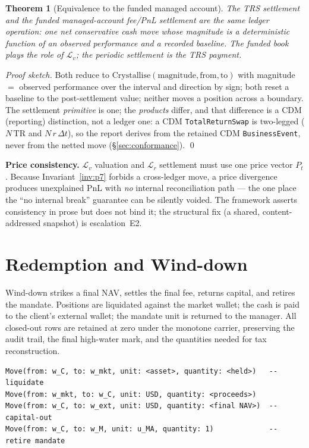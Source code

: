 \documentclass[11pt,a4paper]{article}
\newtheorem{theorem}[definition]{Theorem}
\begin{document}
\begin{theorem}[Equivalence to the funded managed account]
The TRS settlement and the funded managed-account fee/PnL settlement are the \emph{same} ledger
operation: one net conservative cash move whose magnitude is a deterministic function of an
observed performance and a recorded baseline. The funded book plays the role of $\mathcal{L}_v$;
the periodic settlement is the TRS payment.
\end{theorem}
\noindent\textit{Proof sketch.} Both reduce to $\mathrm{Crystallise}(\text{magnitude},\text{from},
\text{to})$ with magnitude $=$ observed performance over the interval and direction by sign; both
reset a baseline to the post-settlement value; neither moves a position across a boundary.
The settlement \emph{primitive} is one; the \emph{products} differ, and that difference is a CDM
(reporting) distinction, not a ledger one: a CDM \texttt{TotalReturnSwap} is two-legged
($N\,\mathrm{TR}$ and $N\,r\,\Delta t$), so the report derives from the retained CDM
\texttt{BusinessEvent}, never from the netted move (\S\ref{sec:conformance}). \qed

\noindent\textbf{Price consistency.} $\mathcal{L}_v$ valuation and $\mathcal{L}_r$ settlement must
use one price vector $P_t$. Because Invariant~\ref{inv:p7} forbids a cross-ledger move, a price
divergence produces unexplained PnL with \emph{no} internal reconciliation path --- the one place
the ``no internal break'' guarantee can be silently voided. The framework asserts consistency in
prose but does not bind it; the structural fix (a shared, content-addressed snapshot) is
escalation~E2.

\section{Redemption and Wind-down}
\label{sec:redemption}

Wind-down strikes a final NAV, settles the final fee, returns capital, and retires the mandate.
Positions are liquidated against the market wallet; the cash is paid to the client's external
wallet; the mandate unit is returned to the manager. All closed-out rows are retained at zero
under the monotone carrier, preserving the audit trail, the final high-water mark, and the
quantities needed for tax reconstruction.
\begin{lstlisting}
Move(from: w_C, to: w_mkt, unit: <asset>, quantity: <held>)   -- liquidate
Move(from: w_mkt, to: w_C, unit: USD, quantity: <proceeds>)
Move(from: w_C, to: w_ext, unit: USD, quantity: <final NAV>)  -- capital-out
Move(from: w_C, to: w_M, unit: u_MA, quantity: 1)             -- retire mandate
\end{lstlisting}
\end{document}
